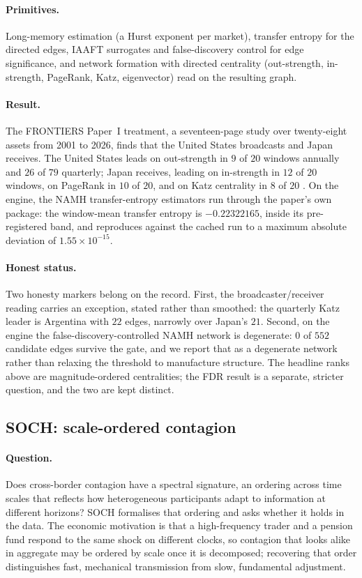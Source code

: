\paragraph{Primitives.} Long-memory estimation (a Hurst exponent per market),
transfer entropy for the directed edges, IAAFT surrogates and false-discovery
control for edge significance, and network formation with directed centrality
(out-strength, in-strength, PageRank, Katz, eigenvector) read on the resulting
graph.

\paragraph{Result.} The FRONTIERS Paper~I treatment, a seventeen-page study over
twenty-eight assets from 2001 to 2026, finds that the United States broadcasts
and Japan receives. The United States leads on out-strength in $9$ of $20$
windows annually and $26$ of $79$ quarterly; Japan receives, leading on
in-strength in $12$ of $20$ windows, on PageRank in $10$ of $20$, and on Katz
centrality in $8$ of $20$ \citep{bhandari2026econstellar,namhpkg}. On the engine,
the NAMH transfer-entropy estimators run through the paper's own 
package: the window-mean transfer entropy is $-0.22322165$, inside its
pre-registered band, and reproduces against the cached run to a maximum absolute
deviation of $1.55\times10^{-15}$.

\paragraph{Honest status.} Two honesty markers belong on the record. First, the
broadcaster/receiver reading carries an exception, stated rather than smoothed:
the quarterly Katz leader is Argentina with $22$ edges, narrowly over Japan's
$21$. Second, on the engine the false-discovery-controlled NAMH network is
degenerate: $0$ of $552$ candidate edges survive the gate, and we report that as
a degenerate network rather than relaxing the threshold to manufacture structure.
The headline ranks above are magnitude-ordered centralities; the FDR result is a
separate, stricter question, and the two are kept distinct.

\subsection{SOCH: scale-ordered contagion}
\label{sec:elem-soch}

\paragraph{Question.} Does cross-border contagion have a spectral signature, an
ordering across time scales that reflects how heterogeneous participants adapt to
information at different horizons? SOCH formalises that ordering and asks whether
it holds in the data. The economic motivation is that a high-frequency trader and
a pension fund respond to the same shock on different clocks, so contagion that
looks alike in aggregate may be ordered by scale once it is decomposed; recovering
that order distinguishes fast, mechanical transmission from slow, fundamental
adjustment.

